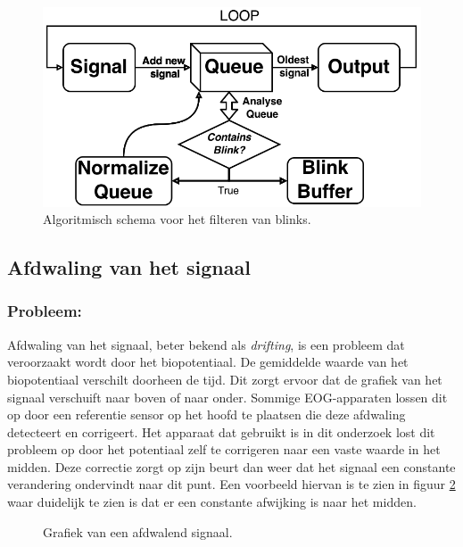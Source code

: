 \documentclass{article}
\newcommand{\figwidth}{0.85\linewidth}
\begin{document}
\begin{figure}[H]
	\centering
	\includegraphics[width = \figwidth]{images/blinkfilterbw}
	\caption{Algoritmisch schema voor het filteren van blinks.}
	\label{fig:algoblinkfilter}
\end{figure}

\subsection{Afdwaling van het signaal}
\subsubsection{Probleem:}
Afdwaling van het signaal, beter bekend als \textit{drifting}, is een probleem dat veroorzaakt wordt door het biopotentiaal. De gemiddelde waarde van het biopotentiaal verschilt doorheen de tijd. Dit zorgt ervoor dat de grafiek van het signaal verschuift naar boven of naar onder. Sommige EOG-apparaten lossen dit op door een referentie sensor op het hoofd te plaatsen die deze afdwaling detecteert en corrigeert. Het apparaat dat gebruikt is in dit onderzoek lost dit probleem op door het potentiaal zelf te corrigeren naar een vaste waarde in het midden. Deze correctie zorgt op zijn beurt dan weer dat het signaal een constante verandering ondervindt naar dit punt. Een voorbeeld hiervan is te zien in figuur \ref{fig:drifting} waar duidelijk te zien is dat er een constante afwijking is naar het midden.\\
\begin{figure}[H]
	\centering
	\caption{Grafiek van een afdwalend signaal.}
	\label{fig:drifting}
\end{figure}
\end{document}
